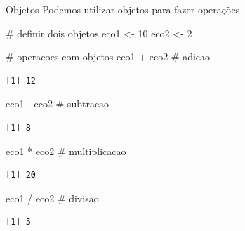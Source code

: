 \documentclass[
  ignorenonframetext,
]{beamer}
\newenvironment{Shaded}{\begin{snugshade}}{\end{snugshade}}
\newcommand{\CommentTok}[1]{\textcolor[rgb]{0.37,0.37,0.37}{#1}}
\newcommand{\DecValTok}[1]{\textcolor[rgb]{0.68,0.00,0.00}{#1}}
\newcommand{\NormalTok}[1]{\textcolor[rgb]{0.00,0.23,0.31}{#1}}
\newcommand{\OtherTok}[1]{\textcolor[rgb]{0.00,0.23,0.31}{#1}}
\newcommand{\SpecialCharTok}[1]{\textcolor[rgb]{0.37,0.37,0.37}{#1}}
\begin{document}
\begin{frame}[fragile]{}
\begin{block}{Objetos}
\protect\hypertarget{objetos-6}{}
Podemos utilizar objetos para fazer operações

\begin{Shaded}
\begin{Highlighting}[]
\CommentTok{\# definir dois objetos}
\NormalTok{eco1 }\OtherTok{\textless{}{-}} \DecValTok{10}
\NormalTok{eco2 }\OtherTok{\textless{}{-}} \DecValTok{2}
\end{Highlighting}
\end{Shaded}

\pause

\begin{Shaded}
\begin{Highlighting}[]
\CommentTok{\# operacoes com objetos}
\NormalTok{eco1 }\SpecialCharTok{+}\NormalTok{ eco2 }\CommentTok{\# adicao}
\end{Highlighting}
\end{Shaded}

\begin{verbatim}
[1] 12
\end{verbatim}

\begin{Shaded}
\begin{Highlighting}[]
\NormalTok{eco1 }\SpecialCharTok{{-}}\NormalTok{ eco2 }\CommentTok{\# subtracao}
\end{Highlighting}
\end{Shaded}

\begin{verbatim}
[1] 8
\end{verbatim}

\begin{Shaded}
\begin{Highlighting}[]
\NormalTok{eco1 }\SpecialCharTok{*}\NormalTok{ eco2 }\CommentTok{\# multiplicacao}
\end{Highlighting}
\end{Shaded}

\begin{verbatim}
[1] 20
\end{verbatim}

\begin{Shaded}
\begin{Highlighting}[]
\NormalTok{eco1 }\SpecialCharTok{/}\NormalTok{ eco2 }\CommentTok{\# divisao}
\end{Highlighting}
\end{Shaded}

\begin{verbatim}
[1] 5
\end{verbatim}
\end{block}


\end{frame}
\end{document}
